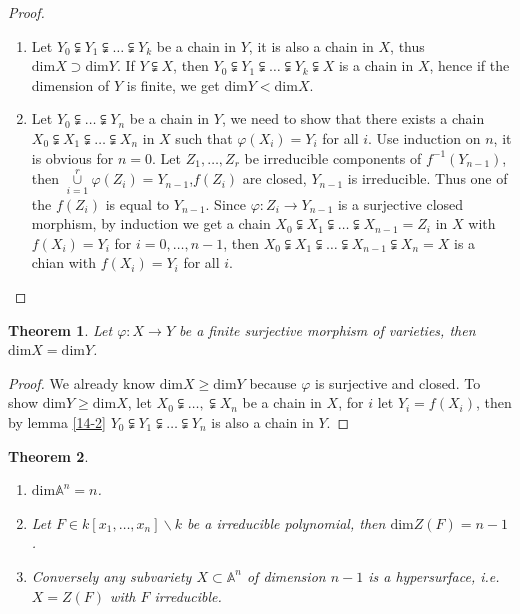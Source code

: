 \documentclass{amsart}
\theoremstyle{plain}
\newtheorem{theorem}{Theorem}
\theoremstyle{definition}
\theoremstyle{remark}
\numberwithin{equation}{section}
\begin{document}
\begin{proof}
	\begin{enumerate}
		\item Let $ Y_0\subsetneqq Y_1\subsetneqq\dots\subsetneqq Y_k $ be a chain in $ Y $, it is also a chain in $ X $, thus $ \text{dim}X\supset \text{dim}Y $. If $ Y\subsetneqq X $, then $ Y_0\subsetneqq Y_1\subsetneqq \dots\subsetneqq Y_k\subsetneqq X $ is a chain in $ X $, hence if the dimension of  $ Y $ is finite, we get $ \text{dim}Y<\text{dim}X $.
		\item Let $ Y_0\subsetneqq \dots\subsetneqq Y_n $ be a chain in $ Y $, we need to show that there exists a chain $ X_0\subsetneqq X_1\subsetneqq \dots\subsetneqq X_n $ in $ X $ such that $ \varphi(X_i)=Y_i $ for all $ i $. Use induction on $ n $, it is obvious for $ n=0 $. Let $ Z_1,\dots,Z_r $ be irreducible components of $ f^{-1}(Y_{n-1}) $, then $ \mathop{\cup}\limits_{i=1}^{r}\varphi(Z_i)=Y_{n-1} $,$ f(Z_i) $ are closed, $ Y_{n-1} $ is irreducible. Thus one of the $ f(Z_i) $ is equal to $ Y_{n-1} $.  Since $ \varphi :Z_i\to Y_{n-1} $ is a surjective closed morphism, by induction we get a chain $ X_0\subsetneqq X_1\subsetneqq \dots\subsetneqq X_{n-1}=Z_i $ in $ X $ with $ f(X_i)=Y_i $ for $ i=0,\dots,n-1 $, then $ X_0\subsetneqq X_1\subsetneqq \dots\subsetneqq X_{n-1}\subsetneqq X_n=X $ is a chian with $ f(X_i)=Y_i $ for all $ i $.
	\end{enumerate}
\end{proof}
\begin{theorem}
	Let $ \varphi:X\to Y $ be a finite surjective morphism of varieties, then $ \text{dim}X=\text{dim}Y $.
\end{theorem}
\begin{proof}
	We already know $ \text{dim}X\geq \text{dim}Y $ because $ \varphi $ is surjective and closed. To show $ \text{dim}Y\geq \text{dim}X $, let $ X_0\subsetneqq \dots,\subsetneqq X_n $ be a chain in $ X $, for $ i $ let $ Y_i=f(X_i) $, then by lemma \ref{14-2} $ Y_0\subsetneqq Y_1\subsetneqq \dots\subsetneqq Y_n $ is also a chain in $ Y $.
\end{proof}
\begin{theorem}\label{14-3}
	\begin{enumerate}
		\item $ \text{dim}\mathbb{A}^n=n $.
		\item Let $ F\in k[x_1,\dots,x_n]\backslash k $ be a irreducible polynomial, then $ \text{dim}Z(F)=n-1 $.
		\item Conversely any subvariety $ X\subset \mathbb{A}^n $ of dimension $ n-1 $ is a hypersurface, i.e. $ X=Z(F) $ with $ F $ irreducible.
 	\end{enumerate}
\end{theorem}
\end{document}
